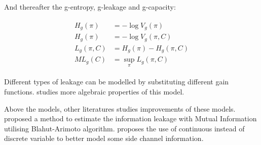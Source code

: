 And thereafter the g-entropy, g-leakage and g-capacity:

\begin{eqnarray}
	\begin{aligned}
		H_{g}(\pi) &= -\log{V_g(\pi)} \\
		H_{g}(\pi) &= -\log{V_g(\pi,C)}\\
		L_g(\pi, C) &= H_{g}(\pi) - H_{g}(\pi, C)\\
		ML_g(C) &= \sup_{\pi}{L_g(\pi,C)}
	\end{aligned}
\end{eqnarray}

Different types of leakage can be modelled by substituting different gain functions. \cite{AddMulGLeakage} studies more algebraic properties of this model.

Above the models, other literatures studies improvements of these models. \cite{EstimateLeakage} proposed a method to estimate the information leakage with Mutual Information utilising Blahut-Arimoto algorithm\cite{Blahut}\cite{Arimoto}. \cite{Continuous} proposes the use of continuous instead of discrete variable to  better model some side channel information.

